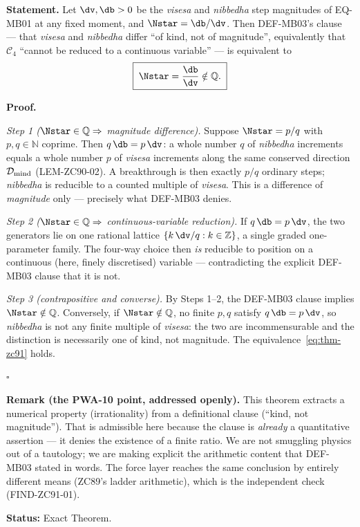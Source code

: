 \documentclass[12pt, a4paper]{article}
\begin{document}
\begin{formalbox}[title={THM-ZC91-01: Irrationality-of-Kind ($R_0$, Exact)}]

\textbf{Statement.} Let $\dv,\db>0$ be the \emph{visesa} and
\emph{nibbedha} step magnitudes of EQ-MB01 at any fixed moment, and
$\Nstar=\db/\dv$. Then DEF-MB03's clause --- that \emph{visesa} and
\emph{nibbedha} differ ``of kind, not of magnitude'', equivalently that
$\mathcal{C}_4$ ``cannot be reduced to a continuous variable'' --- is
equivalent to
\begin{equation}
  \boxed{\;\Nstar=\frac{\db}{\dv}\notin\mathbb{Q}.\;}
  \label{eq:thm-zc91}
\end{equation}

\textbf{Proof.}

\textit{Step 1 ($\Nstar\in\mathbb{Q}\Rightarrow$ magnitude difference).}
Suppose $\Nstar=p/q$ with $p,q\in\mathbb{N}$ coprime. Then
$q\,\db=p\,\dv$: a whole number $q$ of \emph{nibbedha} increments equals a
whole number $p$ of \emph{visesa} increments along the same conserved
direction $\mathcal{D}_{\rm mind}$ (LEM-ZC90-02). A breakthrough is then
exactly $p/q$ ordinary steps; \emph{nibbedha} is reducible to a counted
multiple of \emph{visesa}. This is a difference of \emph{magnitude} only
--- precisely what DEF-MB03 denies.

\textit{Step 2 ($\Nstar\in\mathbb{Q}\Rightarrow$ continuous-variable
reduction).} If $q\,\db=p\,\dv$, the two generators lie on one rational
lattice $\{k\,\dv/q : k\in\mathbb{Z}\}$, a single graded one-parameter
family. The four-way choice then \emph{is} reducible to position on a
continuous (here, finely discretised) variable --- contradicting the
explicit DEF-MB03 clause that it is not.

\textit{Step 3 (contrapositive and converse).} By Steps 1--2, the
DEF-MB03 clause implies $\Nstar\notin\mathbb{Q}$. Conversely, if
$\Nstar\notin\mathbb{Q}$, no finite $p,q$ satisfy $q\,\db=p\,\dv$, so
\emph{nibbedha} is not any finite multiple of \emph{visesa}: the two are
incommensurable and the distinction is necessarily one of kind, not
magnitude. The equivalence~\eqref{eq:thm-zc91} holds.

\hfill$\square$

\textbf{Remark (the PWA-10 point, addressed openly).} This theorem
extracts a numerical property (irrationality) from a definitional clause
(``kind, not magnitude''). That is admissible here because the clause is
\emph{already} a quantitative assertion --- it denies the existence of a
finite ratio. We are not smuggling physics out of a tautology; we are
making explicit the arithmetic content that DEF-MB03 stated in words. The
force layer reaches the same conclusion by entirely different means
(ZC89's ladder arithmetic), which is the independent check (FIND-ZC91-01).


\textbf{Status:} Exact Theorem.
\end{formalbox}
\end{document}
